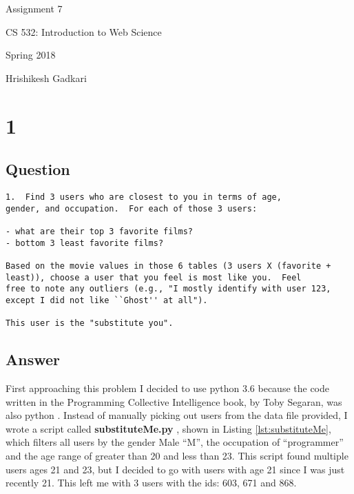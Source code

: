 \documentclass[letterpaper,11pt]{article}
\begin{document}
\begin{titlepage}

\begin{center}

\Huge{Assignment 7}

\Large{CS 532:  Introduction to Web Science}

\Large{Spring 2018}

\Large{Hrishikesh Gadkari}


\end{center}

\end{titlepage}

\newpage


\section*{1}

\subsection*{Question}

\begin{verbatim}
1.  Find 3 users who are closest to you in terms of age, 
gender, and occupation.  For each of those 3 users:

- what are their top 3 favorite films?
- bottom 3 least favorite films?

Based on the movie values in those 6 tables (3 users X (favorite +
least)), choose a user that you feel is most like you.  Feel 
free to note any outliers (e.g., "I mostly identify with user 123,
except I did not like ``Ghost'' at all").  

This user is the "substitute you".  
\end{verbatim}

\clearpage
\subsection*{Answer}

First approaching this problem I decided to use python 3.6 because the code written in the Programming Collective Intelligence book, by Toby Segaran, was also python \cite{collectiveIntell}. Instead of manually picking out users from the data file provided, I wrote a script called \textbf{substituteMe.py} , shown in Listing \ref{lst:substituteMe}, which filters all users by the gender Male ``M'', the occupation of ``programmer'' and the age range of greater than 20 and less than 23. This script found multiple users ages 21 and 23, but I decided to go with users with age 21 since I was just recently 21. This left me with 3 users with the ids: 603, 671 and 868. 
\end{document}
